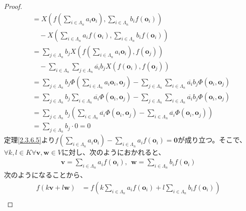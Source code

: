 \documentclass[dvipdfmx]{jsarticle}
\begin{document}
\begin{proof}
\begin{align*}
&= X\left( f\left( \sum_{i \in \varLambda_{n}} {a_{i}\mathbf{o}_{i}} \right),\sum_{i \in \varLambda_{n}} {b_{i}f\left( \mathbf{o}_{i} \right)} \right) \\
&\quad - X\left( \sum_{i \in \varLambda_{n}} {a_{i}f\left( \mathbf{o}_{i} \right)},\sum_{i \in \varLambda_{n}} {b_{i}f\left( \mathbf{o}_{i} \right)} \right)\\
&= \sum_{j \in \varLambda_{n}} {b_{j}X\left( f\left( \sum_{i \in \varLambda_{n}} {a_{i}\mathbf{o}_{i}} \right),f\left( \mathbf{o}_{j} \right) \right)} \\
&\quad - \sum_{i \in \varLambda_{n}} {\sum_{j \in \varLambda_{n}} {\overline{a_{i}}b_{j}X\left( f\left( \mathbf{o}_{i} \right),f\left( \mathbf{o}_{j} \right) \right)}}\\
&= \sum_{j \in \varLambda_{n}} {b_{j}\varPhi \left( \sum_{i \in \varLambda_{n}} {a_{i}\mathbf{o}_{i}},\mathbf{o}_{j} \right)} - \sum_{j \in \varLambda_{n}} {\sum_{i \in \varLambda_{n}} {\overline{a_{i}}b_{j}\varPhi \left( \mathbf{o}_{i},\mathbf{o}_{j} \right)}}\\
&= \sum_{j \in \varLambda_{n}} {b_{j}\sum_{i \in \varLambda_{n}} {\overline{a_{i}}\varPhi \left( \mathbf{o}_{i},\mathbf{o}_{j} \right)}} - \sum_{j \in \varLambda_{n}} {\sum_{i \in \varLambda_{n}} {\overline{a_{i}}b_{j}\varPhi \left( \mathbf{o}_{i},\mathbf{o}_{j} \right)}}\\
&= \sum_{j \in \varLambda_{n}} {b_{j}\left( \sum_{i \in \varLambda_{n}} {\overline{a_{i}}\varPhi \left( \mathbf{o}_{i},\mathbf{o}_{j} \right)} - \sum_{i \in \varLambda_{n}} {\overline{a_{i}}\varPhi \left( \mathbf{o}_{i},\mathbf{o}_{j} \right)} \right)}\\
&= \sum_{j \in \varLambda_{n}} {b_{j} \cdot 0} = 0
\end{align*}
定理\ref{2.3.6.5}より$f\left( \sum_{i \in \varLambda_{n}} {a_{i}\mathbf{o}_{i}} \right) - \sum_{i \in \varLambda_{n}} {a_{i}f\left( \mathbf{o}_{i} \right)} = \mathbf{0}$が成り立つ。そこで、$\forall k,l \in K\forall\mathbf{v},\mathbf{w} \in V$に対し、次のようにおかれると、
\begin{align*}
\mathbf{v} = \sum_{i \in \varLambda_{n}} {a_{i}f\left( \mathbf{o}_{i} \right)},\ \ \mathbf{w} = \sum_{i \in \varLambda_{n}} {b_{i}f\left( \mathbf{o}_{i} \right)}
\end{align*}
次のようになることから、
\begin{align*}
f\left( k\mathbf{v} + l\mathbf{w} \right) &= f\left( k\sum_{i \in \varLambda_{n}} {a_{i}f\left( \mathbf{o}_{i} \right)} + l\sum_{i \in \varLambda_{n}} {b_{i}f\left( \mathbf{o}_{i} \right)} \right)\\

\end{align*}
\end{proof}
\end{document}
